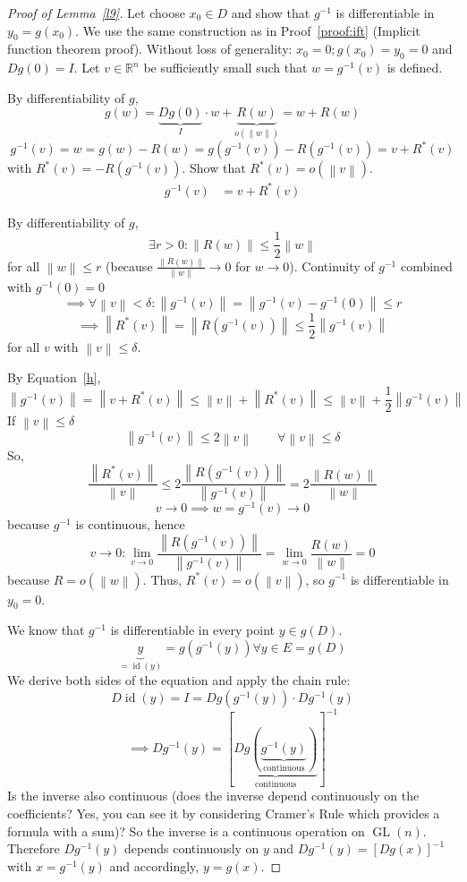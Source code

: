 \documentclass{article}
\newcommand{\norm}[1]{\left\|#1\right\|}
\begin{document}
\begin{proof}[Proof of Lemma~\ref{l9}]
  \label{proof:f9}
  Let choose $x_0 \in D$ and show that $g^{-1}$ is differentiable in $y_0 = g(x_0)$.
  We use the same construction as in Proof~\ref{proof:ift} (Implicit function theorem proof).
  Without loss of generality: $x_0 = 0; g(x_0) = y_0 = 0$ and $Dg(0) = I$.
  Let $v \in \mathbb R^n$ be sufficiently small such that $w = g^{-1}(v)$ is defined.

  By differentiability of $g$,
  \[ g(w) = \underbrace{Dg(0)}_{I} \cdot w + \underbrace{R(w)}_{o(\norm{w})} = w + R(w) \]
  \[ g^{-1}(v) = w = g(w) - R(w) = g(g^{-1}(v)) - R(g^{-1}(v)) = v + R^{*}(v) \]
  with $R^{*}(v) = -R(g^{-1}(v))$. Show that $R^*(v) = o(\norm{v})$.
  \begin{align}
    g^{-1}(v) &= v + R^{*}(v)  \label{h}
  \end{align}

  By differentiability of $g$,
  \[ \exists r > 0: \norm{R(w)} \leq \frac12 \norm{w} \]
  for all $\norm{w} \leq r$ (because $\frac{\norm{R(w)}}{\norm{w}} \to 0$ for $w \to 0$).
  Continuity of $g^{-1}$ combined with $g^{-1}(0) = 0$
  \[ \implies \forall \norm{v} < \delta: \norm{g^{-1}(v)} = \norm{g^{-1}(v) - g^{-1}(0)} \leq r \]
  \[ \implies \norm{R^*(v)} = \norm{R(g^{-1}(v))} \leq \frac12 \norm{g^{-1}(v)} \]
  for all $v$ with $\norm{v} \leq \delta$.

  By Equation~\eqref{h},
  \[ \norm{g^{-1}(v)} = \norm{v + R^*(v)} \leq \norm v + \norm{R^*(v)} \leq \norm v + \frac12 \norm{g^{-1}(v)} \]
  If $\norm v \leq \delta$
  \[ \norm{g^{-1}(v)} \leq 2 \norm v \qquad \forall \norm v \leq \delta \]
  So,
  \[ \frac{\norm{R^*(v)}}{\norm{v}} \leq 2 \frac{\norm{R(g^{-1}(v))}}{\norm{g^{-1}(v)}} = 2 \frac{\norm{R(w)}}{\norm{w}} \]
  \[ v \to 0 \implies w = g^{-1}(v) \to 0 \]
  because $g^{-1}$ is continuous, hence
  \[ v \to 0: \lim_{v \to 0} \frac{\norm{R(g^{-1}(v))}}{\norm{g^{-1}(v)}} = \lim_{w \to 0} \frac{R(w)}{\norm{w}} = 0 \]
  because $R = o(\norm{w})$. Thus, $R^*(v) = o(\norm v)$, so $g^{-1}$ is differentiable in $y_0 = 0$.

  We know that $g^{-1}$ is differentiable in every point $y \in g(D)$.
  \[ \underbrace{y}_{= \operatorname{id}(y)} = g(g^{-1}(y)) \forall y \in E = g(D) \]
  We derive both sides of the equation and apply the chain rule:
  \[ D\operatorname{id}(y) = I = Dg(g^{-1}(y)) \cdot Dg^{-1}(y) \]
  \[ \implies Dg^{-1}(y) = [\underbrace{Dg(\underbrace{g^{-1}(y)}_{\text{continuous}} )}_{\text{continuous}}]^{-1} \]
  Is the inverse also continuous (does the inverse depend continuously on the coefficients? Yes, you can see it by considering Cramer's Rule which provides a formula with a sum)? So the inverse is a continuous operation on $\operatorname{GL}(n)$.
  Therefore $Dg^{-1}(y)$ depends continuously on $y$ and $Dg^{-1}(y) = [Dg(x)]^{-1}$ with $x = g^{-1}(y)$ and accordingly, $y = g(x)$.
\end{proof}
\end{document}
